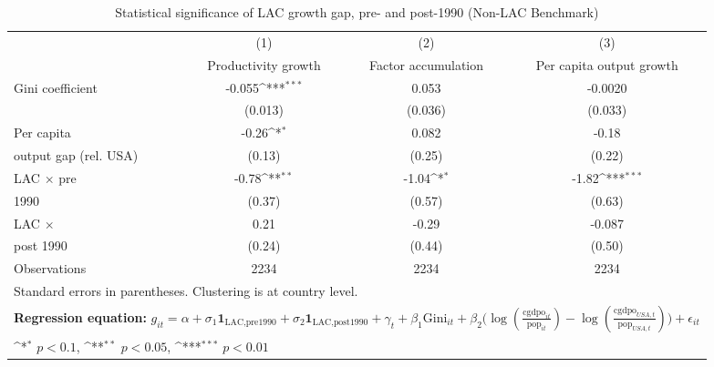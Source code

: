 \begin{table}[htbp]\centering
\def\sym#1{\ifmmode^{#1}\else\(^{#1}\)\fi}
\caption{Statistical significance of LAC growth gap, pre- and post-1990 (Non-LAC Benchmark)}
\begin{tabular}{l*{3}{c}}
\toprule
                &\multicolumn{1}{c}{(1)}&\multicolumn{1}{c}{(2)}&\multicolumn{1}{c}{(3)}\\
                &\multicolumn{1}{c}{Productivity growth}&\multicolumn{1}{c}{Factor accumulation}&\multicolumn{1}{c}{Per capita output growth}\\
\midrule
Gini coefficient     &   -0.055\sym{***}&    0.053         &  -0.0020         \\
           &  (0.013)         &  (0.036)         &  (0.033)         \\
\addlinespace
Per capita      &    -0.26\sym{*}  &    0.082         &    -0.18         \\
output gap (rel. USA)&   (0.13)         &   (0.25)         &   (0.22)         \\
\addlinespace
LAC $\times$ pre&    -0.78\sym{**} &    -1.04\sym{*}  &    -1.82\sym{***}\\
1990            &   (0.37)         &   (0.57)         &   (0.63)         \\
\addlinespace
LAC $\times$    &     0.21         &    -0.29         &   -0.087         \\
post 1990       &   (0.24)         &   (0.44)         &   (0.50)         \\
\midrule
Observations    &     2234         &     2234         &     2234         \\
\bottomrule
\multicolumn{4}{l}{\footnotesize Standard errors in parentheses. Clustering is at country level.}\\
\multicolumn{4}{l}{\footnotesize \textbf{Regression equation:} \scriptsize \(g_{it} = \alpha + \sigma_1 \mathbf{1}_{\textrm{LAC,pre1990}} + \sigma_2 \mathbf{1}_{\textrm{LAC,post1990}} + \gamma_t + \beta_1 \text{Gini}_{it} + \beta_2 \big(\log (\frac{\textrm{cgdpo}_{it}}{\textrm{pop}_{it}} ) - \log (\frac{\textrm{cgdpo}_{USA,t}}{\textrm{pop}_{USA,t}}  ) \big) + \epsilon_{it}\)}\\
\multicolumn{4}{l}{\footnotesize \sym{*} \(p<0.1\), \sym{**} \(p<0.05\), \sym{***} \(p<0.01\)}\\
\end{tabular}
\end{table}
